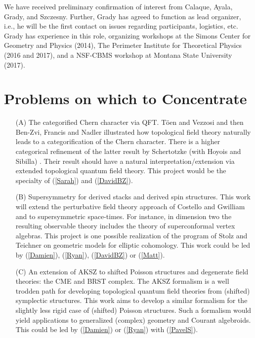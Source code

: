 \documentclass[11pt]{amsart}
\begin{document}
We have received preliminary confirmation of interest from Calaque, Ayala, Grady, and Szczesny. Further, Grady has agreed to function as lead organizer, i.e., he will be the first contact on issues regarding participants, logistics, etc. Grady has experience in this role, organizing workshops at the Simons Center for Geometry and Physics (2014), The Perimeter Institute for Theoretical Physics (2016 and 2017), and a NSF-CBMS workshop at Montana State University (2017). 


\section*{Problems on which to Concentrate}

\begin{itemize}
\item[(A)] The categorified Chern character via QFT.  T\"oen and Vezzosi \cite{TV1} and then Ben-Zvi, Francis and Nadler \cite{BFN} illustrated how topological field theory naturally leads to a categorification of the Chern character.  There is a higher categorical refinement of the latter result by Schertotzke (with Hoyois and Sibilla) \cite{HSS}.  Their result should have a natural interpretation/extension via extended topological quantum field theory. This project would be the specialty of (\ref{Sarah}) and (\ref{DavidBZ}).

\item[(B)] Supersymmetry for derived stacks and derived spin structures. 
This work will extend the perturbative field theory approach of Costello and Gwilliam \cite{CG1} and \cite{CG2}  to supersymmetric space-times. For instance, in dimension two the resulting observable theory includes the theory of superconformal vertex algebras. This project is one possible realization of the program of Stolz and Teichner on geometric models for elliptic cohomology.
This work could be led by (\ref{Damien}), (\ref{Ryan}), (\ref{DavidBZ}) or (\ref{Matt}).  

\item[(C)] An extension of AKSZ to shifted Poisson structures and degenerate field theories: the CME and BRST complex. The AKSZ formalism \cite{AKSZ} is a well trodden path for developing topological quantum field theories from (shifted) symplectic structures. This work aims to develop a similar formalism for the slightly less rigid case of (shifted) Poisson structures.
Such a formalism would yield applications to generalized (complex) geometry and Courant algebroids. 
This could be led by (\ref{Damien}) or (\ref{Ryan}) with (\ref{PavelS}).


\end{itemize}
\end{document}

